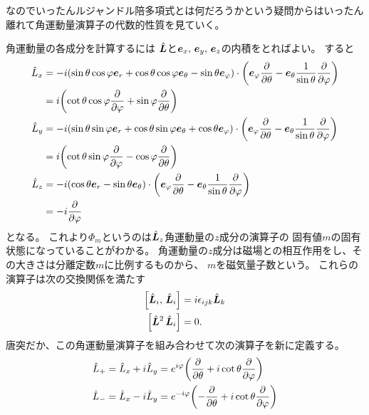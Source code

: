 \documentclass[../../master.tex]{subfiles}
\begin{document}
なのでいったんルジャンドル陪多項式とは何だろうかという疑問からはいったん離れて角運動量演算子の代数的性質を見ていく。


角運動量の各成分を計算するには
\(\hat{\vb*{L}}\)と\(\vb*{e}_x,\,\vb*{e}_y,\,\vb*{e}_z\)の内積をとればよい。
すると
\begin{align}
	\hat{L}_x
	 & = -i(\sin\theta\cos\varphi \vb*{e}_r + \cos\theta\cos\varphi \vb*{e}_\theta - \sin\theta \vb*{e}_\varphi) \cdot
	\qty(\vb*{e}_{\varphi}\pdv{\theta}-\vb*{e}_{\theta}\frac{1}{\sin\theta}\pdv{\varphi}) \notag                       \\
	 & = i\qty(\cot\theta\cos\varphi\pdv{\varphi}+\sin\varphi\pdv{\theta})                                             \\
	\hat{L}_y
	 & = -i(\sin\theta\sin\varphi \vb*{e}_r + \cos\theta\sin\varphi \vb*{e}_\theta + \cos\theta \vb*{e}_\varphi) \cdot
	\qty(\vb*{e}_{\varphi}\pdv{\theta}-\vb*{e}_{\theta}\frac{1}{\sin\theta}\pdv{\varphi}) \notag                       \\
	 & = i\qty(\cot\theta\sin\varphi\pdv{\varphi}-\cos\varphi\pdv{\theta})                                             \\
	\hat{L}_z
	 & = -i(\cos\theta\vb*{e}_r -\sin\theta\vb*{e}_\theta) \cdot
	\qty(\vb*{e}_{\varphi}\pdv{\theta}-\vb*{e}_{\theta}\frac{1}{\sin\theta}\pdv{\varphi}) \notag                       \\
	 & = -i\pdv{\varphi}
\end{align}
となる。
これより\(\Phi_m\)というのは\(\hat{\vb*{L}}_z\)角運動量の\(z\)成分の演算子の
固有値\(m\)の固有状態になっていることがわかる。
角運動量の\(z\)成分は磁場との相互作用をし、その大きさは分離定数\(m\)に比例するものから、
\(m\)を磁気量子数という。
これらの演算子は次の交換関係を満たす
\begin{align}
	\qty[\hat{\vb*{L}}_i,\,\hat{\vb*{L}}_i] & = i\epsilon_{ijk}\hat{\vb*{L}}_k \\
	\qty[\hat{\vb*{L}}^2\,\hat{\vb*{L}}_i]  & =0.
\end{align}
唐突だか、この角運動量演算子を組み合わせて次の演算子を新に定義する。
\begin{align}
	\hat{L}_+ & = \hat{L}_x + i\hat{L}_y = e^{ i\varphi}\qty( \pdv{\theta} +i\cot\theta\pdv{\varphi}) \\
	\hat{L}_- & = \hat{L}_x - i\hat{L}_y = e^{-i\varphi}\qty(-\pdv{\theta} +i\cot\theta\pdv{\varphi})
\end{align}
\end{document}
